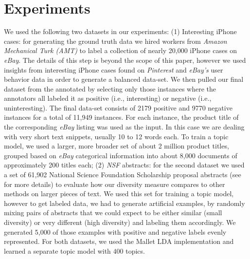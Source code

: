 \documentclass{article}
\begin{document}

\section{Experiments}
\label{sec:experiments}

We used the following two datasets in our experiments: (1) Interesting iPhone cases:
for generating the ground truth data we hired workers from {\em Amazon Mechanical Turk (AMT)} to label a collection
of nearly 20,000 iPhone cases on {\em eBay}. The details of this step is beyond the scope of this paper, however we used insights from
interesting iPhone cases found on {\em Pinterest} and {\em eBay's} user behavior data in order to generate a balanced data-set. 
We then pulled our final dataset from the annotated by selecting only those instances where the annotators all labeled it as
positive (i.e., interesting) or negative (i.e., uninteresting). The final data-set consists of 2179 positive and 9770 negative instances for
a total of 11,949 instances. For each instance, the product title of
the corresponding {\em eBay} listing was used as the input. In this case we are
dealing with very short text snippets, usually 10 to 12 words each. To
train a topic model, we used a larger, more broader set of about
2 million product titles, grouped based on {\em eBay} categorical information into about 8,000
documents of approximately 200 titles each; (2) {\em NSF}
abstracts: for the second dataset we used a set of 61,902 National Science Foundation
Scholarship proposal abstracts (see~\cite{bache:2013} for more details) to evaluate how our diversity measure
compares to other methods on larger pieces of text. We used this set
for training a topic model, however to get labeled data, we had to
generate artificial examples, by randomly mixing pairs of abstracts that we
could expect to be either similar (small diversity) or very different
(high diversity) and labeling them accordingly. We generated 5,000 of
those examples with positive and negative labels evenly represented. For both datasets, we used the Mallet LDA implementation and learned a separate topic model with $400$ topics.
\end{document}
